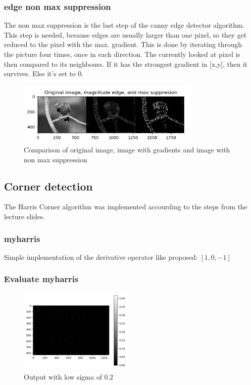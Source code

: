 \documentclass[12pt]{article}
\begin{document}
\subsubsection{edge non max suppression}
The non max suppression is the last step of the canny edge detector algorithm.
This step is needed, bceause edges are usually larger than one pixel, so they
get reduced to the pixel with the max. gradient.
\newline
This is done by iterating through the picture four times, once in each direction. 
The currently looked at pixel is then compared to its neighbours. If it has the
strongest gradient in [x,y], then it survives. Else it's set to 0.

\begin{figure}[!htb]
    \centering
    \includegraphics[width=0.8\textwidth]{pics/origMagNonMax}
    \caption{Comparison of original image, image with gradients and image with non max suppression}
    \label{fig:gradientsnonmax}
\end{figure}

\subsection{Corner detection}
The Harris Corner algorithm was implemented accourding to the steps from the lecture slides.

\subsubsection{myharris}
Simple implementation of the derivative operator like proposed: $[1, 0, -1]$

\pagebreak
\subsubsection{Evaluate myharris}
\begin{figure}[!htb]
    \centering
    \includegraphics[width=0.5\textwidth]{pics/harris1}
    \caption{Output with low sigma of 0.2}
    \label{fig:harrissigma02}
\end{figure}
\end{document}
